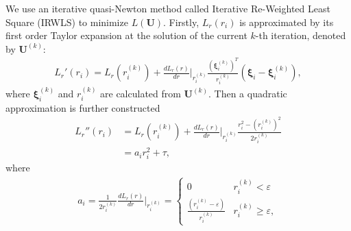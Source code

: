 \documentclass[conference]{IEEEtran}
\begin{document}
We use an iterative quasi-Newton method called Iterative Re-Weighted Least Square (IRWLS) \cite{perez2001fast,tuia2011multioutput} to minimize $L(\bm{U})$. Firstly, $L_r(r_i)$ is approximated by its first order Taylor expansion at the solution of the current $k$-th iteration, denoted by $\bm{U}^{(k)}$:
\begin{equation}
\begin{split}
L_r'(r_i)=L_r(r_i^{(k)})+\frac{dL_r(r)}{dr} \bigg|_{r_i^{(k)}} \frac{(\bm{\xi}_i^{(k)})^T}{r_i^{(k)}}(\bm{\xi}_i-\bm{\xi}_i^{(k)}),
\end{split}
\end{equation}
where $\bm{\xi}_i^{(k)}$ and $r_i^{(k)}$ are calculated from $\bm{U}^{(k)}$. Then a quadratic approximation is further constructed
\begin{equation}
\begin{split}
L_r''(r_i)&=L_r(r_i^{(k)})+\frac{dL_r(r)}{dr} \bigg|_{r_i^{(k)}} \frac{r_i^2-(r_i^{(k)})^2}{2r_i^{(k)}}\\
&=a_ir_i^2+\tau,
\end{split}
\end{equation}
where
\begin{equation}
\begin{split}
a_i=\frac{1}{2r_i^{(k)}}\frac{dL_r(r)}{dr} \bigg|_{r_i^{(k)}}=
\left\{
     \begin{array}{lr}
     0 &r_i^{(k)}<\varepsilon\\
     \frac{(r_i^{(k)}-\varepsilon)}{r_i^{(k)}} &r_i^{(k)} \geq \varepsilon,
     \end{array}
\right.
\end{split}
\end{equation}
\end{document}
